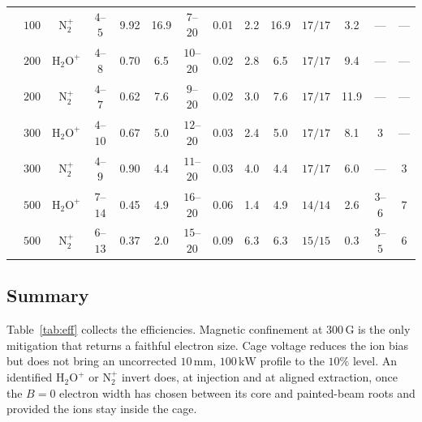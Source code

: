 \documentclass[hyperref]{cernrep}
\begin{document}
\begin{table}[htbp]
{\begin{tabular}{llcccccccccccc}
 & $100$ & $\mathrm{N}_2^+$ & $4$--$5$ & 9.92 & 16.9 & $7$--$20$ & 0.01 & 2.2 & 16.9 & $17/17$ & 3.2 & --- & --- \\
 & $200$ & $\mathrm{H}_2\mathrm{O}^+$ & $4$--$8$ & 0.70 & 6.5 & $10$--$20$ & 0.02 & 2.8 & 6.5 & $17/17$ & 9.4 & --- & --- \\
 & $200$ & $\mathrm{N}_2^+$ & $4$--$7$ & 0.62 & 7.6 & $9$--$20$ & 0.02 & 3.0 & 7.6 & $17/17$ & 11.9 & --- & --- \\
 & $300$ & $\mathrm{H}_2\mathrm{O}^+$ & $4$--$10$ & 0.67 & 5.0 & $12$--$20$ & 0.03 & 2.4 & 5.0 & $17/17$ & 8.1 & $3$ & --- \\
 & $300$ & $\mathrm{N}_2^+$ & $4$--$9$ & 0.90 & 4.4 & $11$--$20$ & 0.03 & 4.0 & 4.4 & $17/17$ & 6.0 & --- & $3$ \\
 & $500$ & $\mathrm{H}_2\mathrm{O}^+$ & $7$--$14$ & 0.45 & 4.9 & $16$--$20$ & 0.06 & 1.4 & 4.9 & $14/14$ & 2.6 & $3$--$6$ & $7$ \\
 & $500$ & $\mathrm{N}_2^+$ & $6$--$13$ & 0.37 & 2.0 & $15$--$20$ & 0.09 & 6.3 & 6.3 & $15/15$ & 0.3 & $3$--$5$ & $6$ \\
\hline\hline
\end{tabular}
}
\end{table}


\clearpage
\subsection{Summary}
\label{sec:sum}

Table~\ref{tab:eff} collects the efficiencies. Magnetic confinement at
$300\,\mathrm{G}$ is the only mitigation that returns a faithful
electron size. Cage voltage reduces the ion bias but does not bring an
uncorrected $10\,\mathrm{mm}$, $100\,\mathrm{kW}$ profile to the
$10\%$ level. An identified $\mathrm{H}_2\mathrm{O}^+$ or
$\mathrm{N}_2^+$ invert does, at injection and at aligned extraction,
once the $B=0$ electron width has chosen between its core and
painted-beam roots and provided the ions stay inside the cage.
\end{document}
